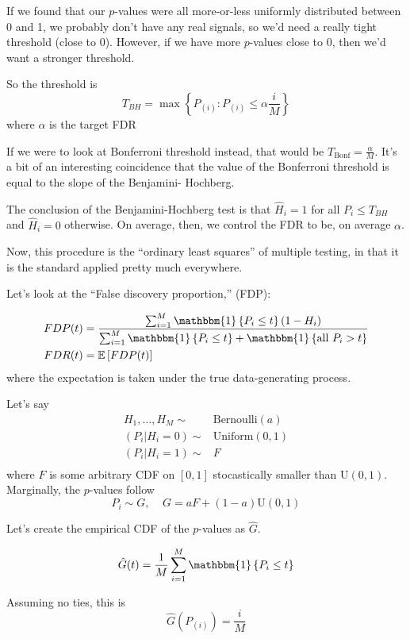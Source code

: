 \documentclass{article}
\newcommand{\indicator}[1]{ \ensuremath{ \mathbbm{1}\left\{ #1 \right\} }   }
\begin{document}
If we found that our $p$-values were all more-or-less uniformly distributed between 0 and 1, we probably don't
have any real signals, so we'd need a really tight threshold (close to 0). However, if we have more $p$-values close
to 0, then we'd want a stronger threshold.

So the threshold is
$$T_{BH}=\max \left\{ P_{(i)} : P_{(i)}\leq \alpha \frac{i}{M}\right\}$$
where $\alpha$ is the target FDR


If we were to look at Bonferroni threshold instead, that would be $T_{\textrm{Bonf}}=\frac{\alpha}{M}$. It's a bit
of an interesting coincidence that the value of the Bonferroni threshold is equal to the slope of the Benjamini-
Hochberg.

The conclusion of the Benjamini-Hochberg test is that $\hat{H}_i=1$ for all $P_i \leq T_{BH}$ and $\hat{H}_i=0$ 
otherwise. On average, then, we control the FDR to be, on average $\alpha$.

Now, this procedure is the ``ordinary least squares'' of multiple testing, in that it is the standard applied pretty
much everywhere.

Let's look at the ``False discovery proportion,'' (FDP):

\begin{align*}
FDP(t) &= \frac{
\sum_{i=1}^M \indicator{P_i\leq t}\left( 1-H_i \right)}{
\sum_{i=1}^M \indicator{P_i\leq t } + \indicator{  \textrm{all~} P_i > t}
}\\
FDR(t)&= \mathbb{E}\left[FDP(t)\right]
\end{align*}
where the expectation is taken under the true data-generating process.

Let's say
\begin{align*}
H_1,\ldots,H_M \sim& \textrm{Bernoulli}(a)\\
(P_i | H_i=0) \sim& \textrm{Uniform}(0,1)\\
(P_i | H_i=1) \sim& F\\
\end{align*}
where $F$ is some arbitrary CDF on $[0,1]$ stocastically smaller than U$(0,1)$. Marginally, the $p$-values follow
$$P_i\sim G,~~~~~G=aF + (1-a)\textrm{U}(0,1)$$

Let's create the empirical CDF of the $p$-values as $\hat{G}$.

$$\hat{G}(t)=\frac{1}{M}\sum_{i=1}^M\indicator{P_i\leq t}$$

Assuming no ties, this is $$\hat{G}(P_{(i)})=\frac{i}{M}$$
\end{document}
